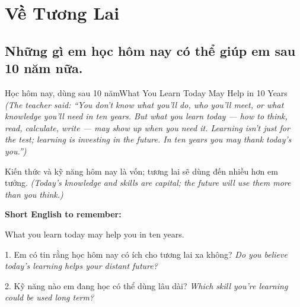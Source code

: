\chapter{Về Tương Lai}

\section{Những gì em học hôm nay có thể giúp em sau 10 năm nữa.}
\begin{truyen}{Học hôm nay, dùng sau 10 năm}{What You Learn Today May Help in 10 Years}
\textit{(The teacher said: ``You don't know what you'll do, who you'll meet, or what knowledge you'll need in ten years. But what you learn today — how to think, read, calculate, write — may show up when you need it. Learning isn't just for the test; learning is investing in the future. In ten years you may thank today's you.'')}
\end{truyen}

\begin{baihoc}
Kiến thức và kỹ năng hôm nay là vốn; tương lai sẽ dùng đến nhiều hơn em tưởng.
\textit{(Today's knowledge and skills are capital; the future will use them more than you think.)}
\end{baihoc}

\begin{ghinhoanh}
\textbf{Short English to remember:}

What you learn today may help you in ten years.

\end{ghinhoanh}

\begin{tuhocnhanh}
1. Em có tin rằng học hôm nay có ích cho tương lai xa không? \textit{Do you believe today's learning helps your distant future?}

2. Kỹ năng nào em đang học có thể dùng lâu dài? \textit{Which skill you're learning could be used long term?}
\end{tuhocnhanh}
\ngancach

